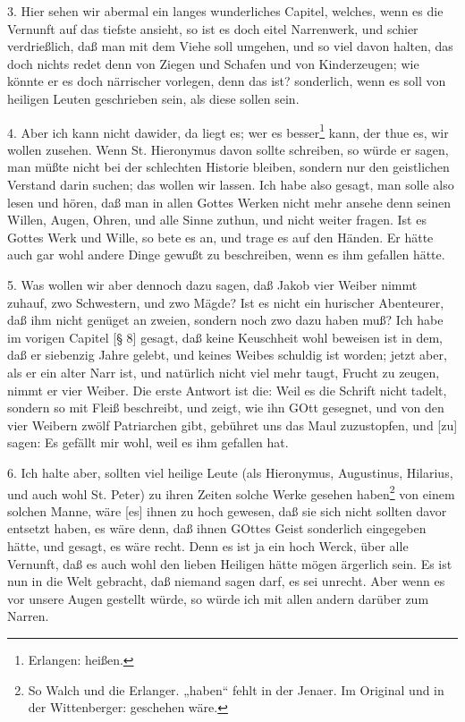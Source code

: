 3. Hier sehen wir abermal ein langes wunderliches Capitel, welches, wenn es die Vernunft auf das tiefste ansieht, so ist es doch eitel Narrenwerk, und schier verdrießlich, daß man mit dem Viehe soll umgehen, und so viel davon halten, das doch nichts redet denn von Ziegen und Schafen und von Kinderzeugen; wie könnte er es doch närrischer vorlegen, denn das ist? sonderlich, wenn es soll von heiligen Leuten geschrieben sein, als diese sollen sein.

4. Aber ich kann nicht dawider, da liegt es; wer es besser\footnote{Erlangen: heißen.} kann, der thue es, wir wollen zusehen. Wenn St. Hieronymus davon sollte schreiben, so würde er sagen, man müßte nicht bei der schlechten Historie bleiben, sondern nur den geistlichen Verstand darin suchen; das wollen wir lassen. Ich habe also gesagt, man solle also lesen und hören, daß man in allen Gottes Werken nicht mehr ansehe denn seinen Willen, Augen, Ohren, und alle Sinne zuthun, und nicht weiter fragen. Ist es Gottes Werk und Wille, so bete es an, und trage es auf den Händen. Er hätte auch gar wohl andere Dinge gewußt zu beschreiben, wenn es ihm gefallen hätte.

5. Was wollen wir aber dennoch dazu sagen, daß Jakob vier Weiber nimmt zuhauf, zwo Schwestern, und zwo Mägde? Ist es nicht ein hurischer Abenteurer, daß ihm nicht genüget an zweien, sondern noch zwo dazu haben muß? Ich habe im vorigen Capitel [§ 8] gesagt, daß keine Keuschheit wohl beweisen ist in dem, daß er siebenzig Jahre gelebt, und keines Weibes schuldig
ist worden; jetzt aber, als er ein alter Narr ist, und natürlich nicht viel mehr taugt, Frucht zu zeugen, nimmt er vier Weiber. Die erste Antwort ist die: Weil es die Schrift nicht tadelt, sondern so mit Fleiß beschreibt, und zeigt, wie ihn GOtt gesegnet, und von den vier Weibern zwölf Patriarchen gibt, gebühret uns das Maul zuzustopfen, und [zu] sagen: Es gefällt mir wohl, weil es ihm gefallen hat.

6. Ich halte aber, sollten viel heilige Leute (als Hieronymus, Augustinus, Hilarius, und auch wohl St. Peter) zu ihren Zeiten solche Werke gesehen haben\footnote{So Walch und die Erlanger. „haben“ fehlt in der Jenaer. Im Original und in der Wittenberger: geschehen wäre.} von einem solchen Manne, wäre [es] ihnen zu hoch gewesen, daß sie sich nicht sollten davor entsetzt haben, es wäre denn, daß ihnen GOttes Geist sonderlich eingegeben hätte, und gesagt, es wäre recht. Denn es ist ja ein hoch Werck, über alle Vernunft, daß es auch wohl den lieben Heiligen hätte mögen ärgerlich sein. Es ist nun in die Welt gebracht, daß niemand sagen darf, es sei unrecht. Aber wenn es vor unsere Augen gestellt würde, so würde ich mit allen andern darüber zum Narren.

